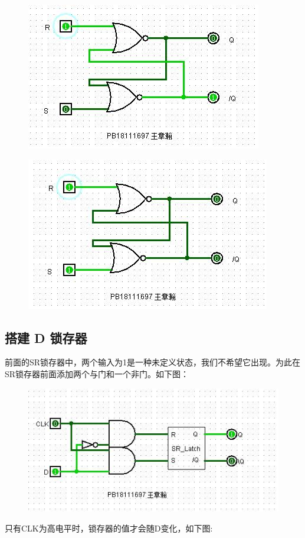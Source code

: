 \documentclass[UTF8]{article}
\begin{document}
\begin{figure}[H]
\begin{minipage}[H]{0.49\linewidth}
			\includegraphics[width=1\linewidth]{2_10.jpg}
			\label{2_10}
		\end{minipage}
		\begin{minipage}[H]{0.49\linewidth}
			\centering
			\includegraphics[width=1\linewidth]{2_11.jpg}
			\label{2_11}
		\end{minipage}
	\end{figure}


	\subsection{搭建 D 锁存器}
	前面的SR锁存器中，两个输入为1是一种未定义状态，我们不希望它出现。为此在SR锁存器前面添加两个与门和一个非门。如下图：
	
	\begin{figure}[H]
		\centering
		\includegraphics[width=1\linewidth]{D_Latch.jpg}
		\label{D_Latch}
	\end{figure}
	只有CLK为高电平时，锁存器的值才会随D变化，如下图:
	
\end{document}
